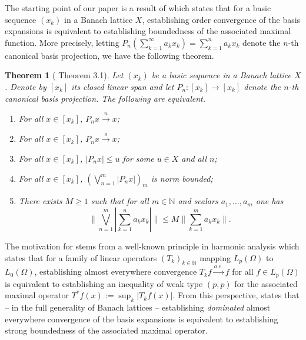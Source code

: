 \documentclass[12pt,leqno]{amsart}
\newtheorem{theorem}{Theorem}[section]
\numberwithin{equation}{section}
\theoremstyle{definition}
\begin{document}
 The starting point of our paper is a result of  \cite{TT19} which states that for a basic sequence $(x_k)$ in a Banach lattice $X$, establishing order convergence of the basis expansions is equivalent to establishing boundedness of the associated maximal function. More precisely, letting $P_n(\sum_{k=1}^\infty a_kx_k)=\sum_{k=1}^n a_kx_k$ denote the $n$-th canonical basis projection, we have the following theorem.
\begin{theorem}[\cite{TT19} Theorem 3.1]\label{bidecomposition}
Let $(x_k)$ be a basic sequence in a Banach lattice $X$. Denote by $[x_k]$ its closed linear span and let $P_n:[x_k]\to [x_k]$  denote the $n$-th canonical basis projection. The following are equivalent.
\begin{enumerate}
\item For all $x\in [x_k]$, $P_nx\xrightarrow{u}x$;
\item For all $x\in [x_k]$, $P_nx\xrightarrow{o}x$;
\item For all $x\in [x_k]$,  $|P_nx|\leq u$ for some $u\in X$ and  all $n$;
\item For all $x\in [x_k]$, $(\bigvee_{n=1}^m\left|P_nx\right|)_m$ is norm bounded;
\item There exists $M\geq 1$ such that for all $m\in \mathbb{N}$ and scalars $a_1,\dots, a_m$  one has 
\begin{equation}\label{bidecomp inequality}
\Bigg\|\bigvee_{n=1}^m\left|\sum_{k=1}^na_kx_k\right|\Bigg\|\leq M\Bigg\|\sum_{k=1}^m a_kx_k\Bigg\|.
\end{equation}
\end{enumerate}
\end{theorem}
The motivation for  stems from a well-known principle  in harmonic analysis \cite{MR0189110,MR0209867,MR0125392} which states that for a family of linear operators $(T_k)_{k\in \mathbb{N}}$ mapping $L_p(\Omega)$ to $L_0(\Omega)$, establishing almost everywhere convergence $T_kf\xrightarrow{a.e.}f$  for all $f\in L_p(\Omega)$ is equivalent to establishing an inequality of weak type $(p,p)$ for the associated maximal operator $T^*f(x):=\sup_k|T_kf(x)|$.  From this perspective,    states that -- in the full generality of Banach lattices -- establishing \emph{dominated} almost everywhere convergence of the basis expansions  is equivalent to establishing strong boundedness of the associated maximal operator. 
\medskip
\end{document}
